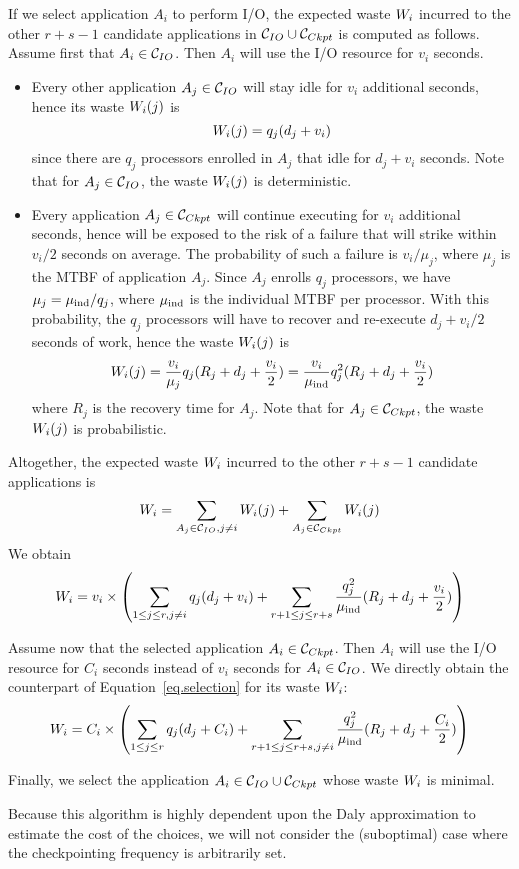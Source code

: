 If we select application $A_{i}$ to perform I/O, the expected waste $W_{i}$
incurred to the other $r+s-1$ candidate applications in  $\mathcal{C}_{IO} \cup
\mathcal{C}_{Ckpt}$ is computed as follows. Assume first that $A_{i} \in \mathcal{C}_{IO}$.
Then  $A_{i}$ will use the I/O resource for $v_{i}$ seconds.
\begin{itemize}
%
  \item Every other application $A_{j} \in \mathcal{C}_{IO}$ will stay idle for $v_{i}$
  additional seconds, hence its waste $W_{i}(j)$ is $$W_{i}(j) = q_{j}
  (d_{j} + v_{i})$$ since there are $q_{j}$ processors enrolled in $A_{j}$ that
  idle for $d_{j} + v_{i}$ seconds. Note that for $A_{j} \in \mathcal{C}_{IO}$, the
  waste $W_{i}(j)$ is deterministic.
%
  \item Every application $A_{j} \in \mathcal{C}_{Ckpt}$ will continue executing for
  $v_{i}$ additional seconds, hence will be exposed to the risk of a failure
  that will strike within $v_{i}/2$ seconds on average. The probability of such
  a failure is $v_{i}/\mu_{j}$, where $\mu_{j}$ is the MTBF of application
  $A_{j}$. Since $A_{j}$ enrolls $q_{j}$ processors, we have $\mu_{j} =
  \mu_{\text{ind}}/q_{j}$, where $\mu_{\text{ind}}$ is the individual MTBF per processor. With this
  probability, the $q_{j}$ processors will have to recover and re-execute $d_{j} +
  v_{i}/2$ seconds of work, hence the waste $W_{i}(j)$ is $$W_{i}(j) =
  \frac{v_{i}}{\mu_{j} } q_{j} (R_{j} + d_{j} + \frac{v_{i}}{2}) =
  \frac{v_{i}}{\mu_{\text{ind}}} q^{2}_{j} (R_{j} + d_{j} + \frac{v_{i}}{2})$$ where
  $R_{j}$ is the recovery time for $A_{j}$. Note that for $A_{j} \in
  \mathcal{C}_{Ckpt}$, the waste $W_{i}(j)$ is probabilistic.
%
 \end{itemize}
 Altogether, the expected waste $W_{i}$ incurred
to the other $r+s-1$ candidate applications is
$$W_{i} = \sum_{A_{j} \in \mathcal{C}_{IO}, j\neq i} W_{i}(j) + \sum_{A_{j} \in \mathcal{C}_{Ckpt}} W_{i}(j)$$
We obtain
\begin{equation}
\label{eq.selection}
 W_{i} = v_{i} \times \left( \sum_{1 \leq j \leq r, j\neq i} q_{j} (d_{j} + v_{i})
 + \sum_{r+1 \leq j \leq r+s}   \frac{q^{2}_{j}}{\mu_{\text{ind}}} (R_{j} + d_{j} + \frac{v_{i}}{2}) \right)
\end{equation}

 Assume now that the selected application $A_{i} \in \mathcal{C}_{Ckpt}$. Then  $A_{i}$ will use the I/O resource for $C_{i}$ seconds instead of $v_{i}$ seconds for $A_{i} \in \mathcal{C}_{IO}$. We directly obtain the counterpart of Equation~\eqref{eq.selection} for its waste $W_{i}$:
 \begin{equation}
\label{eq.selection2}
 W_{i} = C_{i} \times \left( \sum_{1 \leq j \leq r} q_{j} (d_{j} + C_{i})
 + \sum_{r+1 \leq j \leq r+s, j\neq i}   \frac{q^{2}_{j}}{\mu_{\text{ind}}} (R_{j} + d_{j} + \frac{C_{i}}{2}) \right)
\end{equation}

 Finally, we select the application $A_{i} \in \mathcal{C}_{IO} \cup \mathcal{C}_{Ckpt}$ whose waste
 $W_{i}$ is minimal.

Because this algorithm is highly dependent upon the Daly approximation to
estimate the cost of the choices, we will not consider the (suboptimal)
case where the checkpointing frequency is arbitrarily set.
